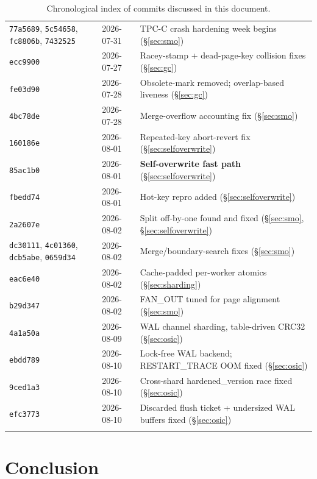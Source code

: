 \documentclass[11pt]{article}
\newcommand{\commit}[1]{\texttt{#1}}
\begin{document}
\begin{longtable}{@{}p{2.1cm}p{1.8cm}p{9.5cm}@{}}
\commit{77a5689}, \commit{5c54658}, \commit{fc8806b}, \commit{7432525} & 2026-07-31 & TPC-C crash hardening week begins (\S\ref{sec:smo}) \\
\commit{ecc9900} & 2026-07-27 & Racey-stamp + dead-page-key collision fixes (\S\ref{sec:gc}) \\
\commit{fe03d90} & 2026-07-28 & Obsolete-mark removed; overlap-based liveness (\S\ref{sec:gc}) \\
\commit{4bc78de} & 2026-07-28 & Merge-overflow accounting fix (\S\ref{sec:smo}) \\
\commit{160186e} & 2026-08-01 & Repeated-key abort-revert fix (\S\ref{sec:selfoverwrite}) \\
\commit{85ac1b0} & 2026-08-01 & \textbf{Self-overwrite fast path} (\S\ref{sec:selfoverwrite}) \\
\commit{fbedd74} & 2026-08-01 & Hot-key repro added (\S\ref{sec:selfoverwrite}) \\
\commit{2a2607e} & 2026-08-02 & Split off-by-one found and fixed (\S\ref{sec:smo}, \S\ref{sec:selfoverwrite}) \\
\commit{dc30111}, \commit{4c01360}, \commit{dcb5abe}, \commit{0659d34} & 2026-08-02 & Merge/boundary-search fixes (\S\ref{sec:smo}) \\
\commit{eac6e40} & 2026-08-02 & Cache-padded per-worker atomics (\S\ref{sec:sharding}) \\
\commit{b29d347} & 2026-08-02 & FAN\_OUT tuned for page alignment (\S\ref{sec:smo}) \\
\commit{4a1a50a} & 2026-08-09 & WAL channel sharding, table-driven CRC32 (\S\ref{sec:osic}) \\
\commit{ebdd789} & 2026-08-10 & Lock-free WAL backend; RESTART\_TRACE OOM fixed (\S\ref{sec:osic}) \\
\commit{9ced1a3} & 2026-08-10 & Cross-shard hardened\_version race fixed (\S\ref{sec:osic}) \\
\commit{efc3773} & 2026-08-10 & Discarded flush ticket + undersized WAL buffers fixed (\S\ref{sec:osic}) \\
\bottomrule
\caption{Chronological index of commits discussed in this document.}
\label{tab:timeline}
\end{longtable}

\section{Conclusion}
\end{document}
